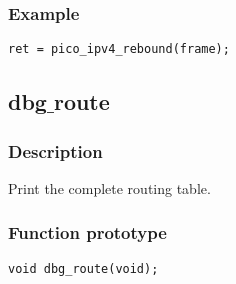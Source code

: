 \subsubsection*{Example}
\begin{verbatim}
ret = pico_ipv4_rebound(frame);
\end{verbatim}



\subsection{dbg$\_$route}

\subsubsection*{Description}
Print the complete routing table. 

\subsubsection*{Function prototype}
\begin{verbatim}
void dbg_route(void);
\end{verbatim}

